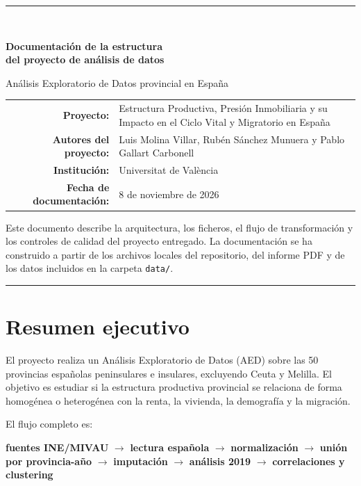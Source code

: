 \documentclass[11pt,a4paper]{article}
\newcommand{\code}[1]{\texttt{\small #1}}
\begin{document}
\begin{titlepage}
\centering
\vspace*{1.8cm}
{\color{azul}\rule{\textwidth}{1.5pt}}\\[0.8cm]
{\Huge\bfseries Documentación de la estructura\\[0.15cm] del proyecto de análisis de datos\par}
\vspace{0.7cm}
{\Large Análisis Exploratorio de Datos provincial en España\par}
\vspace{1.4cm}
\begin{tabular}{rl}
\textbf{Proyecto:} & Estructura Productiva, Presión Inmobiliaria y su Impacto en el Ciclo Vital y Migratorio en España\\
\textbf{Autores del proyecto:} & Luis Molina Villar, Rubén Sánchez Munuera y Pablo Gallart Carbonell\\
\textbf{Institución:} & Universitat de València\\
\textbf{Fecha de documentación:} & 8 de noviembre de 2026
\end{tabular}
\vfill
\begin{minipage}{0.85\textwidth}\small\centering
Este documento describe la arquitectura, los ficheros, el flujo de transformación y los controles de calidad del proyecto entregado. La documentación se ha construido a partir de los archivos locales del repositorio, del informe PDF y de los datos incluidos en la carpeta \code{data/}.
\end{minipage}
\vfill
{\color{azul}\rule{\textwidth}{1.5pt}}
\end{titlepage}

\tableofcontents
\newpage

\section{Resumen ejecutivo}
El proyecto realiza un Análisis Exploratorio de Datos (AED) sobre las 50 provincias españolas peninsulares e insulares, excluyendo Ceuta y Melilla. El objetivo es estudiar si la estructura productiva provincial se relaciona de forma homogénea o heterogénea con la renta, la vivienda, la demografía y la migración.

El flujo completo es:
\begin{center}
\colorbox{azulclaro}{\parbox{0.92\textwidth}{\centering\textbf{fuentes INE/MIVAU} $\rightarrow$ \textbf{lectura española} $\rightarrow$ \textbf{normalización} $\rightarrow$ \textbf{unión por provincia-año} $\rightarrow$ \textbf{imputación} $\rightarrow$ \textbf{análisis 2019} $\rightarrow$ \textbf{correlaciones y clustering}}}
\end{center}
\end{document}
